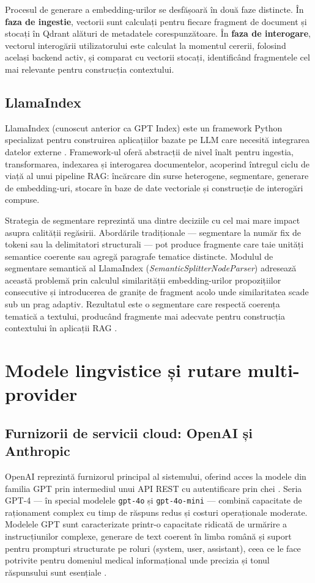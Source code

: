 \documentclass[12pt, a4paper, oneside, romanian]{teza-upb}
\begin{document}
Procesul de generare a embedding-urilor se desfășoară în două faze distincte. În \textbf{faza de ingestie}, vectorii sunt calculați pentru fiecare fragment de document și stocați în Qdrant alături de metadatele corespunzătoare. În \textbf{faza de interogare}, vectorul interogării utilizatorului este calculat la momentul cererii, folosind același backend activ, și comparat cu vectorii stocați, identificând fragmentele cel mai relevante pentru construcția contextului.

\subsection{LlamaIndex}

LlamaIndex (cunoscut anterior ca GPT Index) este un framework Python specializat pentru construirea aplicațiilor bazate pe LLM care necesită integrarea datelor externe \cite{llamaindex_doc}. Framework-ul oferă abstracții de nivel înalt pentru ingestia, transformarea, indexarea și interogarea documentelor, acoperind întregul ciclu de viață al unui pipeline RAG: încărcare din surse heterogene, segmentare, generare de embedding-uri, stocare în baze de date vectoriale și construcție de interogări compuse.

Strategia de segmentare reprezintă una dintre deciziile cu cel mai mare impact asupra calității regăsirii. Abordările tradiționale — segmentare la număr fix de tokeni sau la delimitatori structurali — pot produce fragmente care taie unități semantice coerente sau agregă paragrafe tematice distincte. Modulul de segmentare semantică al LlamaIndex (\textit{SemanticSplitterNodeParser}) adresează această problemă prin calculul similarității embedding-urilor propozițiilor consecutive și introducerea de granițe de fragment acolo unde similaritatea scade sub un prag adaptiv. Rezultatul este o segmentare care respectă coerența tematică a textului, producând fragmente mai adecvate pentru construcția contextului în aplicații RAG \cite{llamaindex_doc}.

\section{Modele lingvistice și rutare multi-provider}

\subsection{Furnizorii de servicii cloud: OpenAI și Anthropic}

OpenAI reprezintă furnizorul principal al sistemului, oferind acces la modele din familia GPT prin intermediul unui API REST cu autentificare prin chei \cite{openai_api}. Seria GPT-4 — în special modelele \texttt{gpt-4o} și \texttt{gpt-4o-mini} — combină capacitate de raționament complex cu timp de răspuns redus și costuri operaționale moderate. Modelele GPT sunt caracterizate printr-o capacitate ridicată de urmărire a instrucțiunilor complexe, generare de text coerent în limba română și suport pentru prompturi structurate pe roluri (system, user, assistant), ceea ce le face potrivite pentru domeniul medical informațional unde precizia și tonul răspunsului sunt esențiale \cite{openai_api}.
\end{document}
